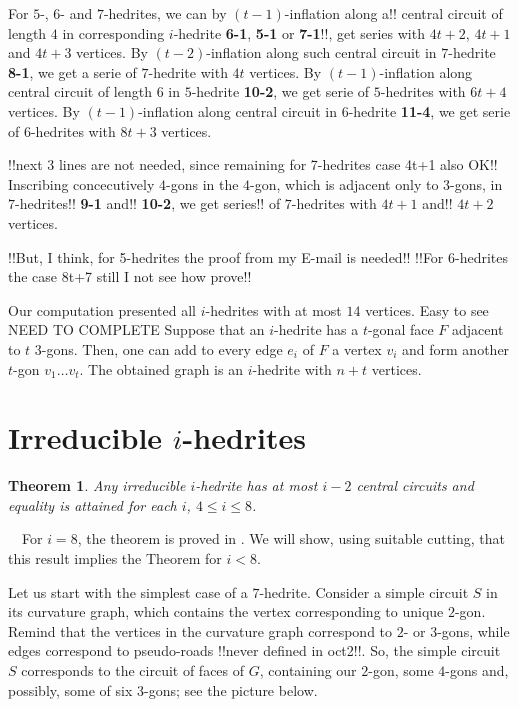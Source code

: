 \documentclass[12pt]{article}
\newtheorem{theorem}{Theorem}
\newcommand{\proof}{\noindent{\bf Proof.}\ \ }
\begin{document}
For $5$-, $6$- and $7$-hedrites, we can by $(t-1)$-inflation 
along a!!
central circuit of length $4$ in corresponding $i$-hedrite 
{\bf 6-1},
{\bf 5-1} or {\bf 7-1}!!, get series with $4t+2$, $4t+1$ and 
$4t+3$ vertices. By $(t-2)$-inflation
along such central circuit in $7$-hedrite {\bf 8-1}, we get a serie of
$7$-hedrite with $4t$ vertices.
By $(t-1)$-inflation along central circuit of length $6$ in 
$5$-hedrite {\bf 10-2}, we get serie of $5$-hedrites with $6t+4$ vertices.
By $(t-1)$-inflation along central circuit in $6$-hedrite {\bf 11-4}, we
get serie of $6$-hedrites with $8t+3$ vertices.

!!next 3 lines are not needed, since remaining for 7-hedrites 
case 4t+1 also OK!!
Inscribing concecutively $4$-gons in the $4$-gon, which is adjacent only to
$3$-gons, in $7$-hedrites!! {\bf 9-1} and!! {\bf 10-2}, we get 
series!! of $7$-hedrites
with $4t+1$ and!! $4t+2$ vertices.

!!But, I think, for 5-hedrites the proof from my E-mail is needed!!
!!For 6-hedrites the case 8t+7 still I not see how prove!!



Our computation presented all $i$-hedrites with at most $14$ vertices. Easy to see NEED TO COMPLETE
Suppose that an $i$-hedrite has a $t$-gonal face $F$ adjacent to $t$ $3$-gons. Then, one can add to every edge $e_i$ of $F$ a vertex $v_i$ and form another $t$-gon $v_1\dots v_t$. The obtained graph is an $i$-hedrite with $n+t$ vertices.




\section{Irreducible $i$-hedrites}



\begin{theorem}\label{irre}
Any irreducible $i$-hedrite has at most $i-2$ central circuits and equality is attained for each $i$, $4\leq i\leq 8$.
\end{theorem}
\proof For $i=8$, the theorem is proved in \cite{DSt}. We will show, using suitable cutting, that this result implies the Theorem for $i<8$.

Let us start with the simplest case of a $7$-hedrite. Consider a simple circuit $S$ in its curvature graph, which contains the vertex corresponding to unique $2$-gon. Remind that the vertices in the curvature graph correspond to $2$- or $3$-gons, while edges correspond to pseudo-roads !!never defined
in oct2!!. So, the simple circuit $S$ corresponds to the circuit of faces of $G$, containing our $2$-gon, some $4$-gons and, possibly, some of six $3$-gons; see the picture below.
\end{document}
